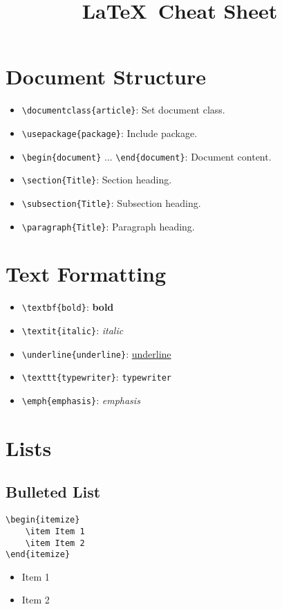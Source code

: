 \documentclass[a4paper,10pt]{article}
\title{\LaTeX\ Cheat Sheet}
\author{}
\date{}
\begin{document}
\maketitle

\section{Document Structure}
\begin{itemize}[noitemsep]
    \item \texttt{\textbackslash documentclass\{article\}}: Set document class.
    \item \texttt{\textbackslash usepackage\{package\}}: Include package.
    \item \texttt{\textbackslash begin\{document\}} ... \texttt{\textbackslash end\{document\}}: Document content.
    \item \texttt{\textbackslash section\{Title\}}: Section heading.
    \item \texttt{\textbackslash subsection\{Title\}}: Subsection heading.
    \item \texttt{\textbackslash paragraph\{Title\}}: Paragraph heading.
\end{itemize}

\section{Text Formatting}
\begin{itemize}[noitemsep]
    \item \texttt{\textbackslash textbf\{bold\}}: \textbf{bold}
    \item \texttt{\textbackslash textit\{italic\}}: \textit{italic}
    \item \texttt{\textbackslash underline\{underline\}}: \underline{underline}
    \item \texttt{\textbackslash texttt\{typewriter\}}: \texttt{typewriter}
    \item \texttt{\textbackslash emph\{emphasis\}}: \emph{emphasis}
\end{itemize}

\section{Lists}
\subsection{Bulleted List}
\begin{verbatim}
\begin{itemize}
    \item Item 1
    \item Item 2
\end{itemize}
\end{verbatim}
\begin{itemize}
    \item Item 1
    \item Item 2
\end{itemize}
\end{document}
